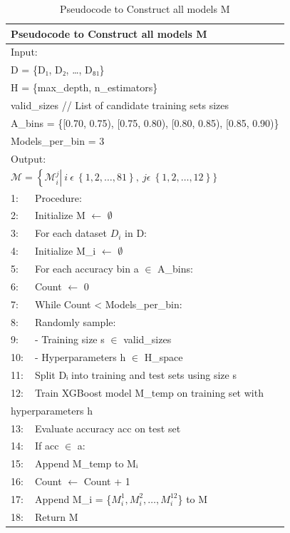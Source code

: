 \documentclass{article}
\begin{document}
\begin{table}[H]
\centering
\caption{Pseudocode to Construct all models M}
\begin{tabularx}{\linewidth}{ll}
\hline
\multicolumn{2}{l}{\textbf{Pseudocode to Construct all models M}} \\
\hline
\multicolumn{2}{l}{Input:}  \\
\multicolumn{2}{l}{\qquad D = \{D₁, D₂, \ldots, D₈₁\}}\\
\multicolumn{2}{l}{\qquad H = \{max\_depth, n\_estimators\}}  \\
\multicolumn{2}{l}{\qquad valid\_sizes // List of candidate training sets sizes}  \\
\multicolumn{2}{l}{\qquad A\_bins = \{[0.70, 0.75), [0.75, 0.80), [0.80, 0.85), [0.85, 0.90)\}} \\
\multicolumn{2}{l}{\qquad Models\_per\_bin = 3} \\
\multicolumn{2}{l}{Output:}  \\
\multicolumn{2}{l}{\qquad $\mathcal{M =}\left\{ \mathcal{M}_{i}^{j} \right|\ i\ \epsilon\ \left\{ 1,2,\ldots,81 \right\},\ j\epsilon\ \left\{ 1,2,\ldots,12 \right\}\}$}  \\
1: & Procedure: \\
2: & Initialize M $\leftarrow$ $\emptyset$ \\
3: & \qquad For each dataset $D_i$ in D: \\
4: & \qquad\qquad Initialize M_i $\leftarrow$ $\emptyset$ \\
5: & \qquad For each accuracy bin a $\in$ A\_bins: \\
6: & \qquad\qquad Count $\leftarrow$ 0 \\
7: & \qquad\qquad While Count < Models\_per\_bin: \\
8: & \qquad\qquad\qquad Randomly sample: \\
9: & \qquad\qquad\qquad\qquad - Training size s $\in$ valid\_sizes \\
10: & \qquad\qquad\qquad\qquad - Hyperparameters h $\in$ H\_space \\
11: & \qquad\qquad\qquad Split Dᵢ into training and test sets using size s \\
12: & \qquad\qquad\qquad Train XGBoost model M\_temp on training set with  \\
\multicolumn{2}{l}{\qquad\qquad\qquad\qquad\; hyperparameters h}\\
13: & \qquad\qquad\qquad Evaluate accuracy acc on test set \\
14: & \qquad\qquad\qquad If acc $\in$ a: \\
15: & \qquad\qquad\qquad\qquad Append M\_temp to Mᵢ \\
16: & \qquad\qquad\qquad\qquad Count $\leftarrow$ Count + 1 \\
17: & \qquad Append M_i = \{$M_{i}^{1}, M_{i}^{2}, \ldots, M_{i}^{12}$\} to M \\
18: & Return M \\
\hline
\end{tabularx}
\end{table}
\end{document}
